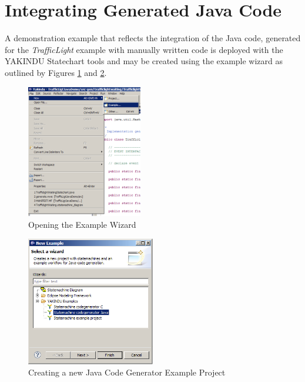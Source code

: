 %
\section{Integrating Generated Java Code}

A demonstration example that reflects the integration of the Java code,
generated for the \emph{TrafficLight} example with manually written code is
deployed with the YAKINDU Statechart tools and may be created using the
example wizard as outlined by Figures \ref{fig:screenshot17} and
\ref{fig:screenshot18}.

\begin{figure}[h!]
\center
\includegraphics[width=0.45\textwidth]{./Pictures/Screenshot17}
\caption{\label{fig:screenshot17} Opening the Example Wizard}
\end{figure}


\begin{figure}[h!]
\center
\includegraphics[width=0.5\textwidth]{./Pictures/Screenshot18}
\caption{\label{fig:screenshot18} Creating a new Java Code Generator Example Project}
\end{figure}

